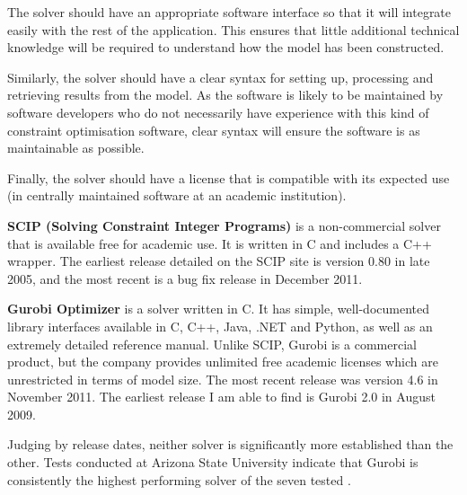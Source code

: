 The solver should have an appropriate software interface so that it will
integrate easily with the rest of the application. This ensures that little
additional technical knowledge will be required to understand how the model
has been constructed.

Similarly, the solver should have a clear syntax for setting up, processing
and retrieving results from the model. As the software is likely to be
maintained by software developers who do not necessarily have experience with
this kind of constraint optimisation software, clear syntax will ensure the
software is as maintainable as possible.

Finally, the solver should have a license that is compatible with its expected
use (in centrally maintained software at an academic institution).

\textbf{SCIP (Solving Constraint Integer Programs)} is a non-commercial solver
that is available free for academic use. It is written in C and includes a C++
wrapper. The earliest release detailed on the SCIP site is version 0.80 in
late 2005, and the most recent is a bug fix release in December 2011.

\textbf{Gurobi Optimizer} is a solver written in C. It has simple,
well-documented library interfaces available in C, C++, Java, .NET and Python,
as well as an extremely detailed reference manual. Unlike SCIP, Gurobi is a
commercial product, but the company provides unlimited free academic licenses
which are unrestricted in terms of model size. The most recent release was
version 4.6 in November 2011. The earliest release I am able to find is Gurobi
2.0 in August 2009.

Judging by release dates, neither solver is significantly more established
than the other. Tests conducted at Arizona State University indicate that
Gurobi is consistently the highest performing solver of the seven tested
\cite{SolversPerformance_2012}.
